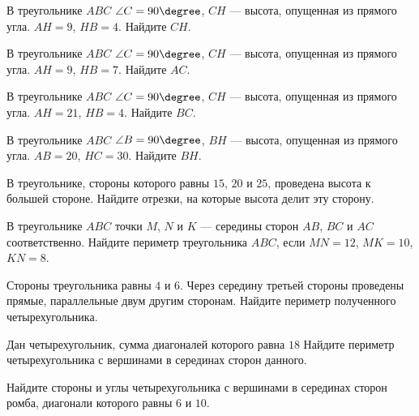\begin{consultation}[number=1]
	\begin{listofex}
		\item В треугольнике \( ABC \) \( \angle C=90\degree \), \( CH \) --- высота, опущенная из прямого угла. \( AH=9 \), \( HB=4 \). Найдите \( CH \).
		\item В треугольнике \( ABC \) \( \angle C=90\degree \), \( CH \) --- высота, опущенная из прямого угла. \( AH=9 \), \( HB=7 \). Найдите \( AC \).
		\item В треугольнике \( ABC \) \( \angle C=90\degree \), \( CH \) --- высота, опущенная из прямого угла. \( AH=21 \), \( HB=4 \). Найдите \( BC \).
		\item В треугольнике \( ABC \) \( \angle B=90\degree \), \( BH \) --- высота, опущенная из прямого угла. \( AB=20 \), \( HC=30 \). Найдите \( BH \).
		\item В треугольнике, стороны которого равны \( 15 \), \( 20 \) и \( 25 \), проведена высота к большей стороне. Найдите отрезки, на которые высота делит эту сторону.
		\item В треугольнике \( ABC \) точки \( M \), \( N \) и \( K \) --- середины сторон \( AB \), \( BC \) и \( AC \) соответственно. Найдите периметр треугольника \( ABC \), если \( MN=12 \), \( MK=10 \), \( KN=8 \).
		\item Стороны треугольника равны \( 4 \) и \( 6 \). Через середину третьей стороны проведены прямые, параллельные двум другим сторонам. Найдите периметр полученного четырехугольника.
		\item Дан четырехугольник, сумма диагоналей которого равна \( 18 \) Найдите периметр четырехугольника с вершинами в серединах сторон данного.
		\item Найдите стороны и углы четырехугольника с вершинами в серединах сторон ромба, диагонали которого равны \( 6 \) и \( 10 \).
	\end{listofex}
\end{consultation}


